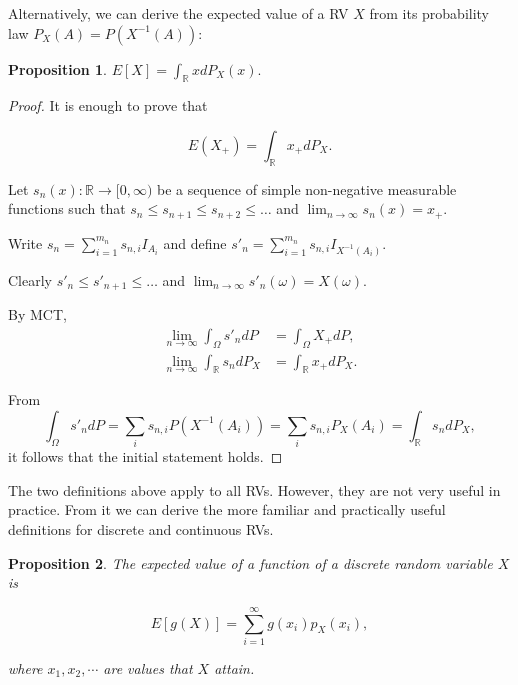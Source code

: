 \documentclass{book}
\theoremstyle{plain}%
\newtheorem{proposition}{Proposition}[section]
\theoremstyle{definition}
\newlength{\arrow}
\begin{document}
Alternatively, we can derive the expected value of a RV $X$ from its probability law $P_X(A) = P(X^{-1}(A))$:

\begin{proposition}
$E[X] = \int_{\mathbb{R}} x dP_X(x).$\label{prop:exp_law}
\end{proposition}

\begin{proof}

It is enough to prove that

$$E(X_+) = \int_\mathbb{R} x_+ dP_X.$$

Let $s_n(x): \mathbb{R} \rightarrow [0, \infty)$ be a sequence of simple non-negative measurable functions such that $s_n \leq s_{n+1} \leq s_{n+2} \leq \dots$ and $\lim_{n\rightarrow\infty}s_n(x)= x_+
$.

Write $s_n = \sum_{i=1}^{m_n} s_{n,i} I_{A_i}$ and define $s'_n = \sum_{i=1}^{m_n} s_{n,i} I_{X^{-1}(A_i)}$.

Clearly $s'_n \leq s'_{n+1} \leq \dots$ and $\lim_{n\rightarrow\infty}s'_n(\omega)= X(\omega)$.

By MCT,
\begin{align*}
	\lim_{n \rightarrow \infty} \int_\Omega s'_n dP
		&= \int_\Omega X_+ dP,\\
	\lim_{n \rightarrow \infty} \int_\mathbb{R} s_n dP_X
		&= \int_\mathbb{R} x_+ dP_X.
\end{align*}

From
$$\int_\Omega s'_n dP = \sum_{i} s_{n,i} P(X^{-1}(A_i)) = \sum_{i} s_{n,i} P_X(A_i) = \int_\mathbb{R} s_n dP_X,$$
it follows that the initial statement holds.

\end{proof}

The two definitions above apply to all RVs. However, they are not very useful in practice. From it we can derive the more familiar and practically useful definitions for discrete and continuous RVs.

\begin{proposition}
The expected value of a function of a discrete random variable $X$ is

$$E[g(X)] = \sum_{i=1}^\infty g(x_i) p_X(x_i),$$

where $x_1, x_2, \cdots$ are values that $X$ attain.
\end{proposition}
\end{document}
